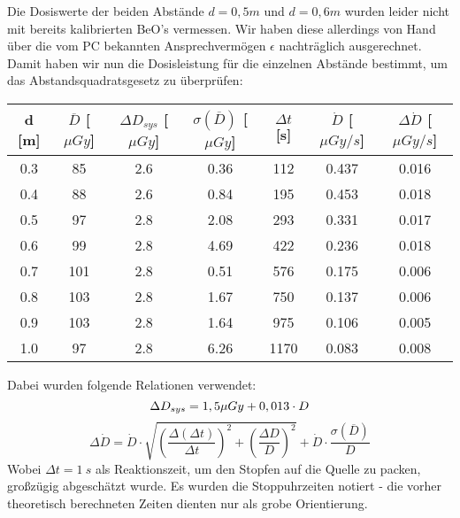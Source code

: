 \begin{center}
\begin{tabular}{c|c|c|c|c}
		\end{tabular}
        \label{dft:osl}
	\end{center}
\minipend
\vspace{5mm}

Die Dosiswerte der beiden Abstände $d = 0,5m$ und $d = 0,6m$ wurden leider nicht mit bereits kalibrierten BeO's vermessen. Wir haben diese allerdings von Hand über die vom PC bekannten Ansprechvermögen $\epsilon$ nachträglich ausgerechnet. \\
Damit haben wir nun die Dosisleistung für die einzelnen Abstände bestimmt, um das Abstandsquadratsgesetz zu überprüfen:

\minipanf
	\begin{center}	
		\begin{tabular}{c|c|c|c|c|c|c}
					d [m] & $\overline{D}$ [$\mu Gy$] & $\Delta D_{sys}$ [$\mu Gy$] & $\sigma(\overline{D})$ [$\mu Gy$] & $\Delta t$ [s] & $\dot{D}$ [$\mu Gy / s$] & $\Delta\dot{D}$ [$\mu Gy / s$] \\
		\hline	0.3 & 85 & 2.6 & 0.36 & 112 & 0.437 & 0.016 \\
				0.4	& 88 & 2.6 & 0.84 & 195 & 0.453 & 0.018 \\
				0.5 & 97 & 2.8 & 2.08 & 293 & 0.331 & 0.017 \\
			    0.6	& 99 & 2.8 & 4.69 & 422 & 0.236 & 0.018 \\
			    0.7 & 101 & 2.8 & 0.51 & 576 & 0.175 & 0.006 \\
			    0.8	& 103 & 2.8 & 1.67 & 750 & 0.137 & 0.006 \\
				0.9 & 103 & 2.8 & 1.64 & 975 & 0.106 & 0.005 \\
				1.0 & 97 & 2.8 & 6.26 & 1170 & 0.083 & 0.008				
		\end{tabular}
		\label{dft:Abstandsquadrat}
	\end{center}
\minipend
\vspace{3mm}

Dabei wurden folgende Relationen verwendet:
\begin{equation*}
	\Delta D_{sys} = 1,5 \mu Gy + 0,013 \cdot D \\
\end{equation*}
\begin{equation*}
	\Delta \dot{D} = \dot{D} \cdot \sqrt{\left(\frac{\Delta (\Delta t)}			{\Delta t}\right)^2 + \left(\frac{\Delta D}{D} \right)^2} + \dot{D} 			\cdot \frac{\sigma(\overline{D})}{D}
\end{equation*}
Wobei $\Delta t = 1\ s$ als Reaktionszeit, um den Stopfen auf die Quelle zu packen, großzügig abgeschätzt wurde. Es wurden die Stoppuhrzeiten notiert - die vorher theoretisch berechneten Zeiten dienten nur als grobe Orientierung.


